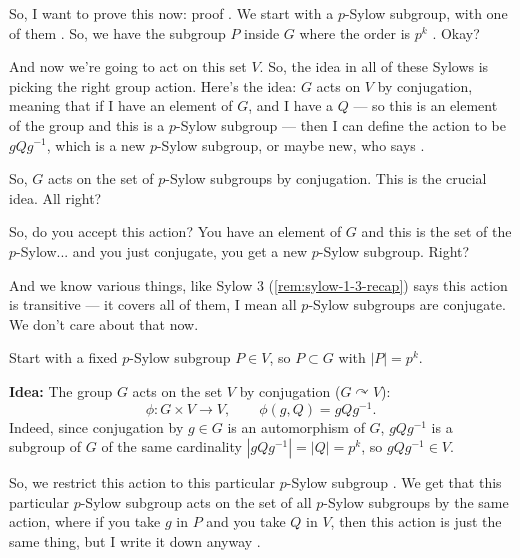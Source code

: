 \begin{proofWrapper}

\begin{speech}[00:02:55 - 00:04:36]
So, I want to prove this now: proof . We start with a $p$-Sylow subgroup, with one of them . So, we have the subgroup $P$ inside $G$ where the order is $p^k$ . Okay?

And now we're going to act on this set $V$. So, the idea in all of these Sylows is picking the right group action. Here's the idea: $G$ acts on $V$ by conjugation, meaning that if I have an element of $G$, and I have a $Q$ --- so this is an element of the group and this is a $p$-Sylow subgroup --- then I can define the action to be $g Q g^{-1}$, which is a new $p$-Sylow subgroup, or maybe new, who says .

So, $G$ acts on the set of $p$-Sylow subgroups by conjugation. This is the crucial idea. All right?

So, do you accept this action? You have an element of $G$ and this is the set of the $p$-Sylow... and you just conjugate, you get a new $p$-Sylow subgroup. Right?

And we know various things, like Sylow $3$ (\cref{rem:sylow-1-3-recap}) says this action is transitive --- it covers all of them, I mean all $p$-Sylow subgroups are conjugate. We don't care about that now.
\end{speech}

\begin{content}
Start with a fixed $p$-Sylow subgroup $P \in V$, so $P \subset G$ with $|P| = p^k$.

\textbf{Idea:} The group $G$ acts on the set $V$ by conjugation ($G \curvearrowright V$):
\[
\phi \colon G \times V \to V, \qquad \phi(g, Q) = g Q g^{-1}.
\]
Indeed, since conjugation by $g \in G$ is an automorphism of $G$, $g Q g^{-1}$ is a subgroup of $G$ of the same cardinality $|g Q g^{-1}| = |Q| = p^k$, so $g Q g^{-1} \in V$.
\end{content}

\begin{speech}[00:04:36 - 00:05:24]
So, we restrict this action to this particular $p$-Sylow subgroup . We get that this particular $p$-Sylow subgroup acts on the set of all $p$-Sylow subgroups by the same action, where if you take $g$ in $P$ and you take $Q$ in $V$, then this action is just the same thing, but I write it down anyway .


\end{speech}
\end{proofWrapper}
